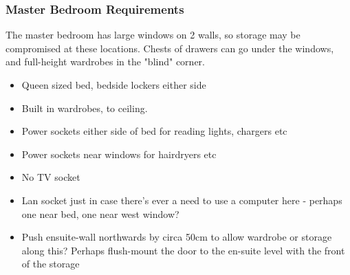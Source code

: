 \subsubsection{Master Bedroom Requirements}
The master bedroom has large windows on 2 walls, so storage may be compromised at these locations. 
Chests of drawers can go under the windows, and full-height wardrobes in the "blind" corner.

\begin{itemize}
\item Queen sized bed, bedside lockers either side
\item Built in wardrobes, to ceiling.
\item Power sockets either side of bed for reading lights, chargers etc
\item Power sockets near windows for hairdryers etc
\item No TV socket
\item Lan socket just in case there's ever a need to use a computer here - perhaps one near bed, one near west window?
\item Push ensuite-wall northwards by circa 50cm to allow wardrobe or storage along this? Perhaps flush-mount the door to the en-suite level with the front of the storage

\end{itemize}
